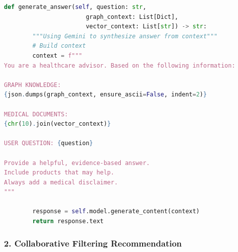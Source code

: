 \documentclass[12pt,a4paper]{article}
\begin{document}
\begin{lstlisting}[language=Python, caption=RAG Engine Core (clinical-advisory-service/graph\_rag/rag\_engine.py)]
    def generate_answer(self, question: str, 
                       graph_context: List[Dict],
                       vector_context: List[str]) -> str:
        """Using Gemini to synthesize answer from context"""
        # Build context
        context = f"""
You are a healthcare advisor. Based on the following information:

GRAPH KNOWLEDGE:
{json.dumps(graph_context, ensure_ascii=False, indent=2)}

MEDICAL DOCUMENTS:
{chr(10).join(vector_context)}

USER QUESTION: {question}

Provide a helpful, evidence-based answer. 
Include products that may help.
Always add a medical disclaimer.
"""
        
        response = self.model.generate_content(context)
        return response.text
\end{lstlisting}

\subsubsection{2. Collaborative Filtering Recommendation}
\end{document}
